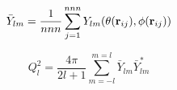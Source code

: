 \documentclass[12pt]{article}
\begin{document}
$$
   \bar{Y}_{lm} = \frac{1}{nnn}\sum_{j = 1}^{nnn} Y_{lm}( \theta( {\bf r}_{ij} ), \phi( {\bf r}_{ij} ) ) 
$$

$$
   Q^2_l = \frac{4 \pi}{2 l + 1} \sum_{m = -l}^{m = l} \bar{Y}_{lm} \bar{Y}^*_{lm}
   $$
\end{document}
